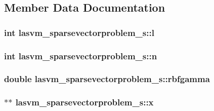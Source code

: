 \subsection{Member Data Documentation}
\hypertarget{structlasvm__sparsevectorproblem__s_a0409f7771e82c142b4880c7fdb69a7a5}{
\subsubsection[{l}]{\setlength{\rightskip}{0pt plus 5cm}int lasvm\+\_\+sparsevectorproblem\+\_\+s\+::l}}\label{structlasvm__sparsevectorproblem__s_a0409f7771e82c142b4880c7fdb69a7a5}
\hypertarget{structlasvm__sparsevectorproblem__s_aceae2f92d2c8e412390f69c5bfeb2371}{
\subsubsection[{n}]{\setlength{\rightskip}{0pt plus 5cm}int lasvm\+\_\+sparsevectorproblem\+\_\+s\+::n}}\label{structlasvm__sparsevectorproblem__s_aceae2f92d2c8e412390f69c5bfeb2371}
\hypertarget{structlasvm__sparsevectorproblem__s_a3d8114617a48411eba18fd76dfc373c4}{
\subsubsection[{rbfgamma}]{\setlength{\rightskip}{0pt plus 5cm}double lasvm\+\_\+sparsevectorproblem\+\_\+s\+::rbfgamma}}\label{structlasvm__sparsevectorproblem__s_a3d8114617a48411eba18fd76dfc373c4}
\hypertarget{structlasvm__sparsevectorproblem__s_a8d0cb897b080699c427448abf38a1256}{
\subsubsection[{x}]{$\ast$$\ast$ lasvm\+\_\+sparsevectorproblem\+\_\+s\+::x}}\label{structlasvm__sparsevectorproblem__s_a8d0cb897b080699c427448abf38a1256}
